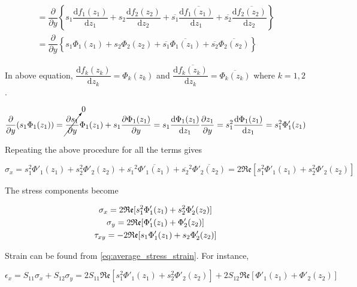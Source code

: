 \documentclass{article}
\begin{document}
\begin{align*}
    & = \dfrac{\partial}{\partial y} \left\{ s_1 \dfrac{\mathrm{d} f_1(z_1)}{\mathrm{d} z_1} + 
    s_2 \dfrac{\mathrm{d} f_2(z_2)}{\mathrm{d} z_2} +
    \overline{s_1} \dfrac{\mathrm{d} \overline{f_1(z_1)}}{\mathrm{d} z_1} +
    \overline{s_2}\dfrac{\mathrm{d} \overline{f_2(z_2)}}{\mathrm{d} z_2}
    \right\} & \\
    & = \dfrac{\partial}{\partial y} \left\{ s_1 \Phi_1(z_1) + s_2 \Phi_2(z_2) + \overline{s_1} \overline{\Phi_1(z_1)} + \overline{s_2} \overline{\Phi_2(s_2)} \right\} &
\end{align*}

In above equation, $\dfrac{\mathrm{d} f_k(z_k)}{\mathrm{d} z_k} = \Phi_k(z_k)$ and $\dfrac{\mathrm{d} \overline{f_k(z_k)}}{\mathrm{d} z_k} = \overline{\Phi_k(z_k)}$ where $k = 1, 2$. 

\begin{equation*}
    \dfrac{\partial}{\partial y} (s_1 \Phi_1(z_1)) = \cancelto{0}{\dfrac{\partial s_1}{\partial y}} \Phi_1(z_1) + s_1 \dfrac{\partial \Phi_1(z_1)}{\partial y} = s_1 \dfrac{\mathrm{d} \Phi_1(z_1)}{\mathrm{d} z_1} \dfrac{\partial z_1}{\partial y} = s_1^2 \dfrac{\mathrm{d} \Phi_1(z_1)}{\mathrm{d} z_1} = s_1^2 \Phi'_1(z_1) 
\end{equation*}

Repeating the above procedure for all the terms gives

\begin{equation*}
    \sigma_x = s_1^2 \Phi'_1(z_1) + s_2^2 \Phi'_2(z_2) + \overline{s_1}^2 \overline{\Phi'_1(z_1)} + \overline{s_2}^2 \overline{\Phi'_2(z_2)} = 2 \mathfrak{Re}[s_1^2 \Phi'_1(z_1) + s_2^2 \Phi'_2(z_2)]
\end{equation*}

The stress components become

\begin{gather}
    \sigma_x = 2 \mathfrak{Re}[s_1^2 \Phi'_1(z_1) + s_2^2 \Phi'_2(z_2)]  \notag \\
    \sigma_y = 2 \mathfrak{Re}[\Phi'_1(z_1) + \Phi'_2(z_2)]  \notag \\
    \tau_{xy} = -2 \mathfrak{Re}[s_1 \Phi'_1(z_1) + s_2 \Phi'_2(z_2)] 
    \label{eq:stresses}
\end{gather}

Strain can be found from \cref{eq:average_stress_strain}. For instance, 

\begin{equation*}
    \epsilon_x = S_{11} \sigma_x + S_{12} \sigma_y = 2 S_{11} \mathfrak{Re}[s_1^2 \Phi'_1(z_1) + s_2^2 \Phi'_2(z_2)] + 2 S_{12} \mathfrak{Re}[\Phi'_1(z_1) + \Phi'_2(z_2)]
\end{equation*}
\end{document}
